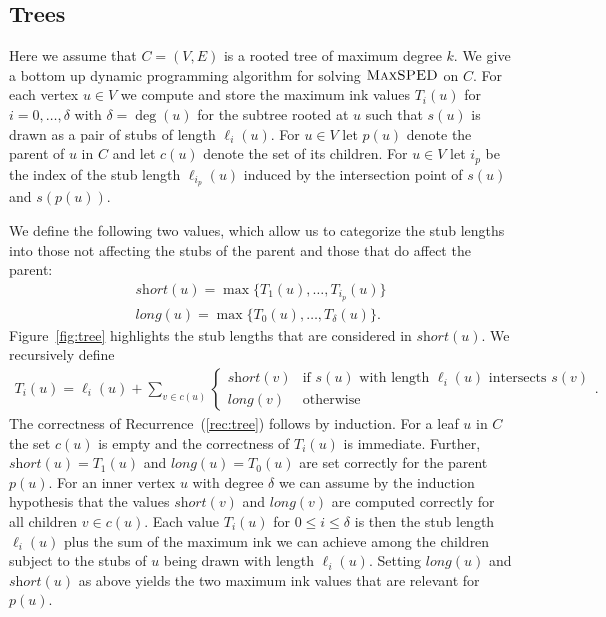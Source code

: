\documentclass[a4paper, USenglish]{llncs}
\newcommand{\maxsped}{\ensuremath{\textsc{MaxSPED}}\xspace}
\newcommand{\sollong}{\ensuremath{\textit{long}}\xspace}
\newcommand{\solshort}{\ensuremath{\textit{short}}\xspace}
\begin{document}
	\subsection{Trees}
	\label{sec:tree}
	
	Here we assume that $ C =(V,E) $ is a rooted tree of maximum degree $ k $. 
	We give a bottom up dynamic programming algorithm for solving \maxsped on $ C $. 
	For each vertex $u \in V$ we compute and store the maximum ink values $T_i(u)$ for $i = 0, \dots, \delta$ with $\delta = \deg(u)$ for the subtree rooted at $u$ such that $s(u)$ is drawn as a pair of stubs of length $\ell_i(u)$.
	For $ u \in V $ let $ p(u) $ denote the parent of $ u $ in $ C $ and let $ c(u) $ denote the set of its children. 
	For $ u \in V $  %
	let $ i_p $ be the index of the stub length $\ell_{i_p}(u)$ induced by the intersection point of $s(u)$ and $s(p(u))$.

	We define the following two values, which allow us to categorize the stub lengths into those not affecting the stubs of the parent and those that do affect the parent:
	\begin{align*}
		\solshort(u) = \max\{T_1(u),\dots,T_{i_p}(u)\}\\ %
		\sollong(u) = \max\{T_0(u),\dots,T_{\delta}(u)\}.
	\end{align*}
	Figure~\ref{fig:tree} highlights the stub lengths that are considered in $\solshort(u)$. We recursively define 
	\begin{align}
	\label{rec:tree}
	T_i(u) = \ell_i(u) + \sum_{v \in c(u)}
	\begin{cases}
	\solshort(v) & \text{if } s(u) \text{ with length } \ell_i(u) \text{ intersects } s(v) \\
	\sollong(v) & \text{otherwise}
	\end{cases}.
	\end{align}
	The correctness of Recurrence~(\ref{rec:tree}) follows by induction. 
	For a leaf $u$ in $C$ the set $c(u)$ is empty and the correctness of $T_i(u)$ is immediate.
	Further, $\solshort(u) = T_1(u)$ and $\sollong(u) = T_0(u)$ are set correctly for the parent $p(u)$.
	For an inner vertex $ u $ with degree $\delta$ we can assume by the induction hypothesis that the values $ \solshort(v) $ and $ \sollong(v) $ are computed correctly for all children $ v \in c(u) $. 
	Each value $ T_i(u) $ for $ 0 \leq i \leq \delta $ is then the stub length $ \ell_i(u) $ plus the sum of the maximum ink we can achieve among the children subject to the stubs of $u$ being drawn with length $\ell_i(u)$. 
	Setting $ \sollong(u) $ and $ \solshort(u) $ as above yields the two maximum ink values that are relevant for $ p(u) $.
	
\end{document}
